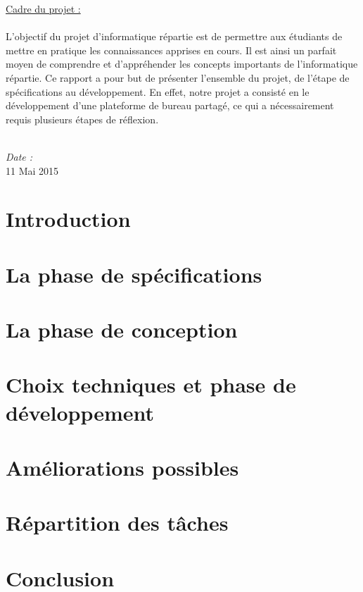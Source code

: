 \documentclass[a4paper,12pt]{report}
\begin{document}
\begin{titlepage}
    \large{\underline{Cadre du projet : }} \\ \\
    \normalsize{L'objectif du projet d'informatique répartie est de permettre aux étudiants de 
        mettre en pratique les connaissances apprises en cours. Il est ainsi un parfait moyen
        de comprendre et d'appréhender les concepts importants de l'informatique répartie. Ce rapport
        a pour but de présenter l'ensemble du projet, de l'étape de spécifications au développement. En effet, 
        notre projet a consisté en le développement d'une plateforme de bureau partagé, ce qui a 
        nécessairement requis plusieurs étapes de réflexion.} \\ \\
    \begin{center}
        \textit{Date :} \\ 11 Mai 2015
    \end{center}
\end{titlepage}

\tableofcontents

\chapter*{Introduction}


\chapter{La phase de spécifications}


\chapter{La phase de conception}


\chapter{Choix techniques et phase de développement}


\chapter{Améliorations possibles}


\chapter{Répartition des tâches}


\chapter*{Conclusion}

\end{document}

